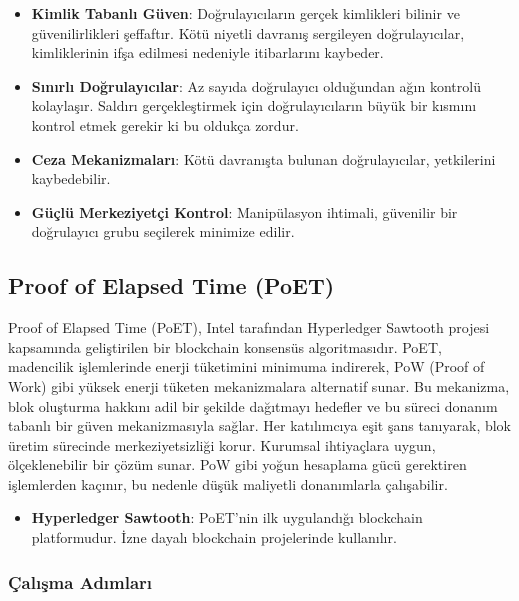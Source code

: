 \begin{itemize}
    \item \textbf{Kimlik Tabanlı Güven}: Doğrulayıcıların gerçek kimlikleri bilinir ve güvenilirlikleri şeffaftır. Kötü niyetli davranış sergileyen doğrulayıcılar, kimliklerinin ifşa edilmesi nedeniyle itibarlarını kaybeder.
    \item \textbf{Sınırlı Doğrulayıcılar}: Az sayıda doğrulayıcı olduğundan ağın kontrolü kolaylaşır. Saldırı gerçekleştirmek için doğrulayıcıların büyük bir kısmını kontrol etmek gerekir ki bu oldukça zordur.
    \item \textbf{Ceza Mekanizmaları}: Kötü davranışta bulunan doğrulayıcılar, yetkilerini kaybedebilir.
    \item \textbf{Güçlü Merkeziyetçi Kontrol}: Manipülasyon ihtimali, güvenilir bir doğrulayıcı grubu seçilerek minimize edilir.
\end{itemize}

\newpage

\subsection{Proof of Elapsed Time (PoET)}

Proof of Elapsed Time (PoET), Intel tarafından Hyperledger Sawtooth projesi kapsamında geliştirilen bir blockchain konsensüs algoritmasıdır. PoET, madencilik işlemlerinde enerji tüketimini minimuma indirerek, PoW (Proof of Work) gibi yüksek enerji tüketen mekanizmalara alternatif sunar. Bu mekanizma, blok oluşturma hakkını adil bir şekilde dağıtmayı hedefler ve bu süreci donanım tabanlı bir güven mekanizmasıyla sağlar. Her katılımcıya eşit şans tanıyarak, blok üretim sürecinde merkeziyetsizliği korur. Kurumsal ihtiyaçlara uygun, ölçeklenebilir bir çözüm sunar. PoW gibi yoğun hesaplama gücü gerektiren işlemlerden kaçınır, bu nedenle düşük maliyetli donanımlarla çalışabilir.

\begin{itemize}
    \item \textbf{Hyperledger Sawtooth}: PoET'nin ilk uygulandığı blockchain platformudur. İzne dayalı blockchain projelerinde kullanılır.
\end{itemize}

\subsubsection{Çalışma Adımları}

